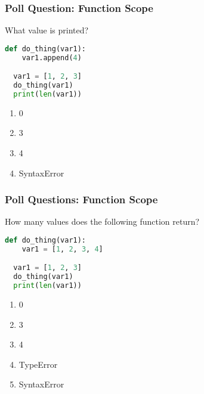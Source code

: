 \documentclass{beamer}
\begin{document}
%
%
\begin{frame}[fragile]
  \frametitle{Poll Question: Function Scope}
  What value is printed?
  \begin{lstlisting}[language=Python, autogobble]
  def do_thing(var1):
    var1.append(4)

  var1 = [1, 2, 3]
  do_thing(var1)
  print(len(var1))
  \end{lstlisting}
  \vfill
  \begin{enumerate}[A]
    \item 0
    \item 3
    \item 4 
    \item SyntaxError
  \end{enumerate}
\end{frame}

%
%
\begin{frame}[fragile]
  \frametitle{Poll Questions: Function Scope}
  How many values does the following function return?
  \begin{lstlisting}[language=Python, autogobble]
  def do_thing(var1):
    var1 = [1, 2, 3, 4]

  var1 = [1, 2, 3]
  do_thing(var1)
  print(len(var1))
  \end{lstlisting}
  \vfill
  \begin{enumerate}[A]
    \item 0
    \item 3 
    \item 4
    \item TypeError
    \item SyntaxError
  \end{enumerate}
\end{frame}
\end{document}
